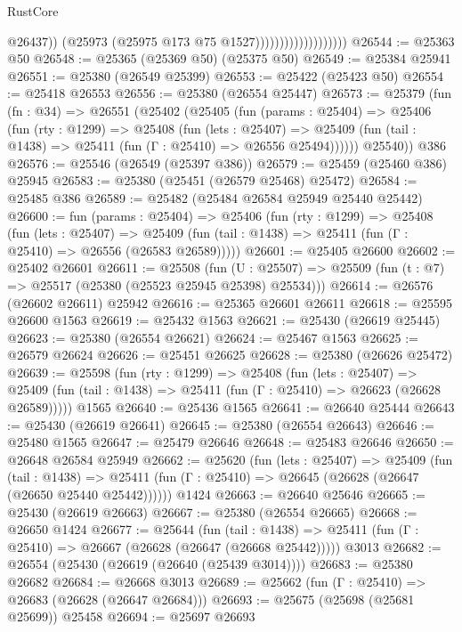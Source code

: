 \begin{lexlean}{RustCore}
\begin{coremodule}
                                          @26437))
                                      (@25973 (@25975 @173 @75 @1527)))))))))))))))))))
@26544 := @25363 @50
@26548 := @25365 (@25369 @50) (@25375 @50)
@26549 := @25384 @25941
@26551 := @25380 (@26549 @25399)
@26553 := @25422 (@25423 @50)
@26554 := @25418 @26553
@26556 := @25380 (@26554 @25447)
@26573 := @25379
    (fun (fn : @34) =>
    @26551
      (@25402
        (@25405
          (fun (params : @25404) =>
          @25406
            (fun (rty : @1299) =>
            @25408
              (fun (lets : @25407) =>
              @25409 (fun (tail : @1438) => @25411 (fun (Γ : @25410) => @26556 @25494))))))
        @25540))
    @386
@26576 := @25546 (@26549 (@25397 @386))
@26579 := @25459 (@25460 @386) @25945
@26583 := @25380 (@25451 (@26579 @25468) @25472)
@26584 := @25485 @386
@26589 := @25482 (@25484 @26584 @25949 @25440 @25442)
@26600 := fun (params : @25404) =>
  @25406
    (fun (rty : @1299) =>
    @25408
      (fun (lets : @25407) =>
      @25409 (fun (tail : @1438) => @25411 (fun (Γ : @25410) => @26556 (@26583 @26589)))))
@26601 := @25405 @26600
@26602 := @25402 @26601
@26611 := @25508
    (fun (U : @25507) => @25509 (fun (t : @7) => @25517 (@25380 (@25523 @25945 @25398) @25534)))
@26614 := @26576 (@26602 @26611) @25942
@26616 := @25365 @26601 @26611
@26618 := @25595 @26600 @1563
@26619 := @25432 @1563
@26621 := @25430 (@26619 @25445)
@26623 := @25380 (@26554 @26621)
@26624 := @25467 @1563
@26625 := @26579 @26624
@26626 := @25451 @26625
@26628 := @25380 (@26626 @25472)
@26639 := @25598
    (fun (rty : @1299) =>
    @25408
      (fun (lets : @25407) =>
      @25409 (fun (tail : @1438) => @25411 (fun (Γ : @25410) => @26623 (@26628 @26589)))))
    @1565
@26640 := @25436 @1565
@26641 := @26640 @25444
@26643 := @25430 (@26619 @26641)
@26645 := @25380 (@26554 @26643)
@26646 := @25480 @1565
@26647 := @25479 @26646
@26648 := @25483 @26646
@26650 := @26648 @26584 @25949
@26662 := @25620
    (fun (lets : @25407) =>
    @25409
      (fun (tail : @1438) =>
      @25411 (fun (Γ : @25410) => @26645 (@26628 (@26647 (@26650 @25440 @25442))))))
    @1424
@26663 := @26640 @25646
@26665 := @25430 (@26619 @26663)
@26667 := @25380 (@26554 @26665)
@26668 := @26650 @1424
@26677 := @25644
    (fun (tail : @1438) => @25411 (fun (Γ : @25410) => @26667 (@26628 (@26647 (@26668 @25442)))))
    @3013
@26682 := @26554 (@25430 (@26619 (@26640 (@25439 @3014))))
@26683 := @25380 @26682
@26684 := @26668 @3013
@26689 := @25662 (fun (Γ : @25410) => @26683 (@26628 (@26647 @26684)))
@26693 := @25675 (@25698 (@25681 @25699)) @25458
@26694 := @25697 @26693

\end{coremodule}
\end{lexlean}
